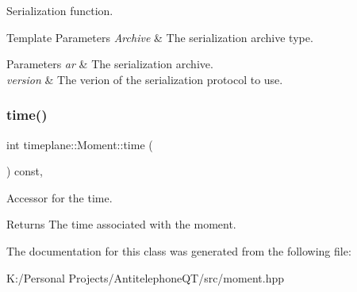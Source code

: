Serialization function. 


\begin{DoxyTemplParams}{Template Parameters}
{\em Archive} & The serialization archive type. \\
\hline
\end{DoxyTemplParams}

\begin{DoxyParams}{Parameters}
{\em ar} & The serialization archive. \\
\hline
{\em version} & The verion of the serialization protocol to use. \\
\hline
\end{DoxyParams}
\mbox{\label{classtimeplane_1_1_moment_a118be8757aa459d4d6e4d859a5164251}} 
\subsubsection{\texorpdfstring{time()}{time()}}
{\footnotesize\ttfamily int timeplane\+::\+Moment\+::time (\begin{DoxyParamCaption}{ }\end{DoxyParamCaption}) const\hspace{0.3cm}{\ttfamily [inline]}, {\ttfamily [noexcept]}}



Accessor for the time. 

\begin{DoxyReturn}{Returns}
The time associated with the moment. 
\end{DoxyReturn}


The documentation for this class was generated from the following file\+:\begin{DoxyCompactItemize}
\item 
K\+:/\+Personal Projects/\+Antitelephone\+Q\+T/src/moment.\+hpp\end{DoxyCompactItemize}
